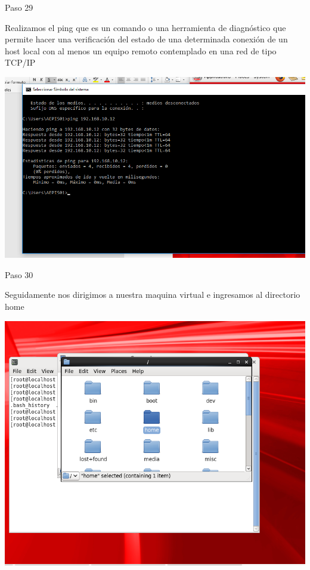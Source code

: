 \begin{itemize}
\begin{center}
    Paso 29
\end{center}

    Realizamos el ping que es un comando o una herramienta de diagnóstico que permite hacer una verificación del estado de una determinada conexión de un host local con al menos un equipo remoto contemplado en una red de tipo TCP/IP \\
	\begin{center}
	\includegraphics[width=15cm]{./Imagenes/imagen29} 
	\end{center}

\end{itemize} 

\begin{itemize}
\begin{center}
    Paso 30
\end{center}

    Seguidamente nos dirigimos a nuestra maquina virtual e ingresamos al directorio home \\
	\begin{center}
	\includegraphics[width=15cm]{./Imagenes/imagen30} 
	\end{center}

\end{itemize} 

